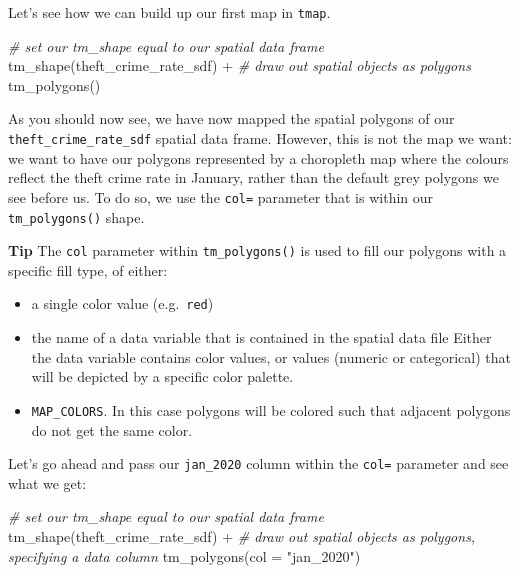 \documentclass[
]{book}
\newenvironment{Shaded}{\begin{snugshade}}{\end{snugshade}}
\newcommand{\AttributeTok}[1]{\textcolor[rgb]{0.77,0.63,0.00}{#1}}
\newcommand{\CommentTok}[1]{\textcolor[rgb]{0.56,0.35,0.01}{\textit{#1}}}
\newcommand{\FunctionTok}[1]{\textcolor[rgb]{0.00,0.00,0.00}{#1}}
\newcommand{\NormalTok}[1]{#1}
\newcommand{\SpecialCharTok}[1]{\textcolor[rgb]{0.00,0.00,0.00}{#1}}
\newcommand{\StringTok}[1]{\textcolor[rgb]{0.31,0.60,0.02}{#1}}
\providecommand{\tightlist}{%
  \setlength{\itemsep}{0pt}\setlength{\parskip}{0pt}}
\begin{document}
Let's see how we can build up our first map in \texttt{tmap}.

\begin{Shaded}
\begin{Highlighting}[]
\CommentTok{\# set our tm\_shape equal to our spatial data frame}
\FunctionTok{tm\_shape}\NormalTok{(theft\_crime\_rate\_sdf) }\SpecialCharTok{+}
  \CommentTok{\# draw out spatial objects as polygons}
  \FunctionTok{tm\_polygons}\NormalTok{()}
\end{Highlighting}
\end{Shaded}

As you should now see, we have now mapped the spatial polygons of our \texttt{theft\_crime\_rate\_sdf} spatial data frame. However, this is not the map we want: we want to have our polygons represented by a choropleth map where the colours reflect the theft crime rate in January, rather than the default grey polygons we see before us. To do so, we use the \texttt{col=} parameter that is within our \texttt{tm\_polygons()} shape.

\textbf{Tip}
The \texttt{col} parameter within \texttt{tm\_polygons()} is used to fill our polygons with a specific fill type, of either:

\begin{itemize}
\tightlist
\item
  a single color value (e.g.~\texttt{red})
\item
  the name of a data variable that is contained in the spatial data file Either the data variable contains color values, or values (numeric or categorical) that will be depicted by a specific color palette.
\item
  \texttt{MAP\_COLORS}. In this case polygons will be colored such that adjacent polygons do not get the same color.
\end{itemize}

Let's go ahead and pass our \texttt{jan\_2020} column within the \texttt{col=} parameter and see what we get:

\begin{Shaded}
\begin{Highlighting}[]
\CommentTok{\# set our tm\_shape equal to our spatial data frame}
\FunctionTok{tm\_shape}\NormalTok{(theft\_crime\_rate\_sdf) }\SpecialCharTok{+}
  \CommentTok{\# draw out spatial objects as polygons, specifying a data column}
  \FunctionTok{tm\_polygons}\NormalTok{(}\AttributeTok{col =} \StringTok{"jan\_2020"}\NormalTok{)}
\end{Highlighting}
\end{Shaded}
\end{document}
